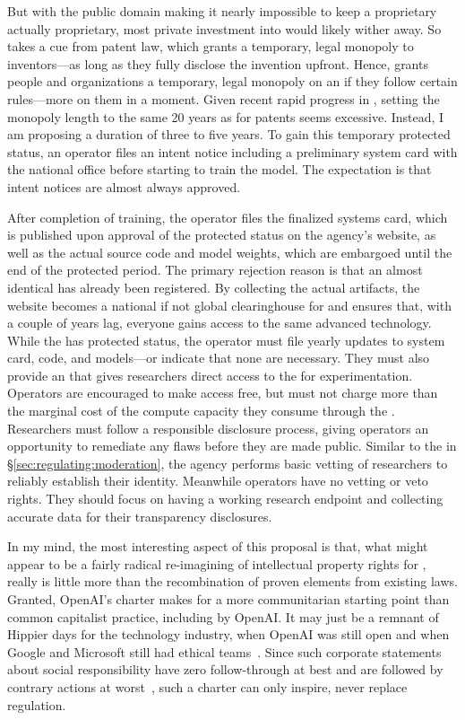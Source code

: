 But with the public domain making it nearly impossible to keep a proprietary
 actually proprietary, most private investment into  would likely wither
away. So  takes a cue from patent law, which grants a temporary, legal
monopoly to inventors---as long as they fully disclose the invention upfront.
Hence,  grants people and organizations a temporary, legal monopoly on an
 if they follow certain rules---more on them in a moment. Given recent rapid
progress in , setting the monopoly length to the same 20 years as for patents
seems excessive. Instead, I am proposing a duration of three to five years. To
gain this temporary protected status, an  operator files an intent notice
including a preliminary system card with the national  office before
starting to train the model. The expectation is that intent notices are almost
always approved.

After completion of training, the operator files the finalized systems card,
which is published upon approval of the protected status on the agency's
website, as well as the actual source code and model weights, which are
embargoed until the end of the protected period. The primary rejection reason is
that an almost identical  has already been registered. By collecting the
actual artifacts, the  website becomes a national if not global
clearinghouse for  and ensures that, with a couple of years lag, everyone
gains access to the same advanced technology. While the  has protected
status, the operator must file yearly updates to system card, code, and
models---or indicate that none are necessary. They must also provide an 
that gives  researchers direct access to the  for experimentation.
Operators are encouraged to make  access free, but must not charge more
than the marginal cost of the compute capacity they consume through the .
Researchers must follow a responsible disclosure process, giving operators an
opportunity to remediate any flaws before they are made public. Similar to the
 in \S\ref{sec:regulating:moderation}, the  agency performs basic
vetting of researchers to reliably establish their identity. Meanwhile operators
have no vetting or veto rights. They should focus on having a working research
endpoint and collecting accurate data for their transparency disclosures.

In my mind, the most interesting aspect of this proposal is that, what might
appear to be a fairly radical re-imagining of intellectual property rights for
, really is little more than the recombination of proven elements from
existing  laws. Granted, OpenAI's charter makes for a more communitarian
starting point than common capitalist practice, including by OpenAI. It may just
be a remnant of Hippier days for the technology industry, when OpenAI was still
open and when Google and Microsoft still had ethical 
teams~\cite{GrantBassea2021,GrantEidelson2022,Newton2023}. Since such corporate
statements about social responsibility have zero follow-through at best and are
followed by contrary actions at
worst~\cite{BebchukKastielea2022,RaghunandanRajgopal2022,Useem2020}, such a
charter can only inspire, never replace regulation.


